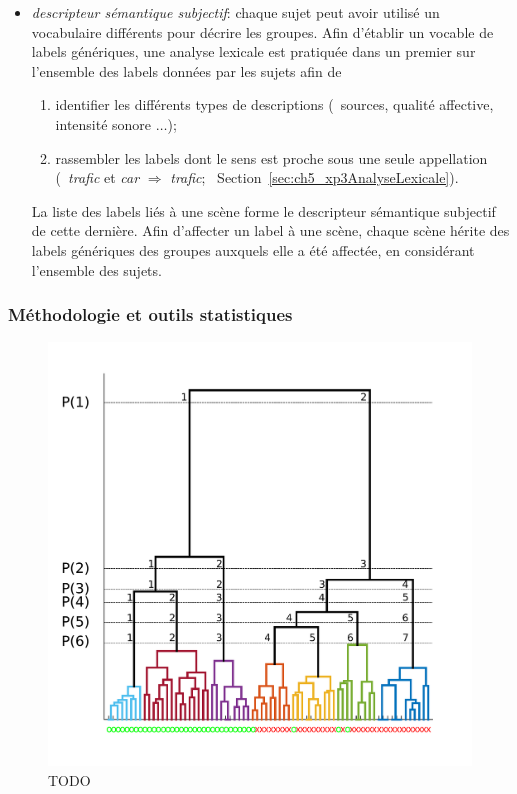 \begin{itemize}
\item \emph{descripteur sémantique subjectif}: chaque sujet peut avoir utilisé un vocabulaire différents pour décrire les groupes. Afin d'établir un vocable de labels génériques, une analyse lexicale est pratiquée dans un premier sur l'ensemble des labels données par les sujets afin de 

\begin{enumerate}
\item identifier les différents types de descriptions (\eg~sources, qualité affective, intensité sonore $\ldots$);
\item rassembler les labels dont le sens est proche sous une seule appellation (\eg~\emph{trafic} et \emph{car} $\Longrightarrow$ \emph{trafic}; \cf~Section~\ref{sec:ch5_xp3AnalyseLexicale}).
\end{enumerate}

La liste des labels liés à une scène forme le descripteur sémantique subjectif de cette dernière. Afin d'affecter un label à une scène, chaque scène hérite des labels génériques des groupes auxquels elle a été affectée, en considérant l'ensemble des sujets. 

\end{itemize}

\subsubsection{Méthodologie et outils statistiques}

\begin{figure}[t]
        \myfloatalign
        \includegraphics[width=.8\linewidth]{gfx/ch_5/dendrogram}
        \caption[TODO]{TODO}\label{fig:dendrogram}
\end{figure}

